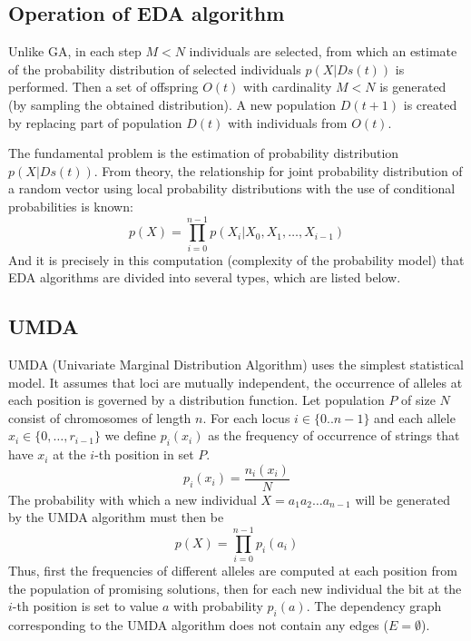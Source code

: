 \subsection{Operation of EDA algorithm}
Unlike GA, in each step $M < N$  individuals are selected, from
which an estimate of the probability distribution of selected individuals $p(X | Ds(t))$ is performed.
Then a set of offspring $O(t)$ with cardinality $M < N$ is generated (by sampling the obtained distribution).
A new population $D(t+1)$ is created by replacing part of population $D(t)$ with individuals from $O(t)$.


The fundamental problem is the estimation of probability distribution
$p(X|Ds(t))$. From theory, the relationship for joint probability distribution
of a random vector using local probability distributions
with the use of conditional probabilities is known:
\begin{equation}
p(X) = \prod\limits^{n-1}_{i=0} p(X_i | X_0 , X_1,\dots, X_{i-1})
\end{equation}
And it is precisely in this computation (complexity of the probability model) that EDA algorithms are divided
into several types, which are listed below.

\subsection{UMDA}\label{algorithmUMDA}
UMDA (Univariate Marginal Distribution Algorithm) uses the simplest
statistical model. It assumes that loci are mutually independent, the occurrence of alleles
at each position is governed by a distribution function.
Let population $P$ of size $N$ consist of chromosomes of length $n$. For each
locus $i \in \{0 .. n-1\}$ and each allele $x_i \in \{0,\dots,r_{i-1}\}$ we define $p_i(x_i)$ as the frequency
of occurrence of strings that have $x_i$ at the $i$-th position in set $P$.
\begin{equation}
  p_i(x_i) = \frac{n_i(x_i)}{N}
\end{equation}
The probability with which a new individual
$X = a_1 a_2 \dots a_{n-1}$ will be generated by the UMDA algorithm must then be
\begin{equation}
  p(X) = \prod\limits^{n-1}_{i=0} p_i(a_i)
\end{equation}
Thus, first the frequencies of different alleles are computed at each position
from the population of promising solutions, then for each new individual the bit at the $i$-th position
is set to value $a$ with probability $p_i(a)$. The dependency graph corresponding to
the UMDA algorithm does not contain any edges ($E = \emptyset$).

